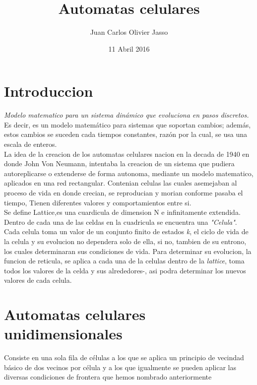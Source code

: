 \documentclass[11pt]{article}
\title{\textbf{Automatas celulares}}
\author{Juan Carlos Olivier Jasso\\}
\date{11 Abril 2016}
\begin{document}
\maketitle
\tableofcontents
\clearpage

\section{Introduccion}

\emph{Modelo matematico para un sistema dinámico que evoluciona en pasos discretos.} Es decir, es un modelo matemático para sistemas que soportan cambios; además, estos cambios se suceden cada tiempos constantes, razón por la cual, se usa una escala de enteros. \\
 	
La idea de la creacion de los automatas celulares nacion en la decada de 1940 en donde John Von Neumann, intentaba la creacion de un sistema que pudiera autoreplicarse o extenderse de forma autonoma, mediante un modelo matematico, aplicados en una red rectangular. Contenian celulas las cuales asemejaban al proceso de vida en donde crecian, se reproducian y morian conforme pasaba el tiempo, Tienen diferentes valores y comportamientos entre si.\\

Se define Lattice,es una cuardicula de dimension N e infinitamente extendida. Dentro de cada una de las celdas en la cuadricula se encuentra una \emph{"Celula"}. Cada celula toma un valor de un conjunto finito de estados \emph{k}, el ciclo de vida de la celula y su evolucion no dependera solo de ella, si no, tambien de su entrono, los cuales determinaran sus condiciones de vida. Para determinar su evolucion, la funcion de reticula, se aplica a cada una de la celulas dentro de la \emph{lattice}, toma todos los valores de la celda y sus alrededores-, asi podra determinar los nuevos valores de cada celula.

\newpage

\section{Automatas celulares unidimensionales}

Consiste en una sola fila de células a los que se aplica un principio de vecindad básico de dos vecinos por célula y a los que igualmente se pueden aplicar las diversas condiciones de frontera que hemos nombrado anteriormente
\end{document}
